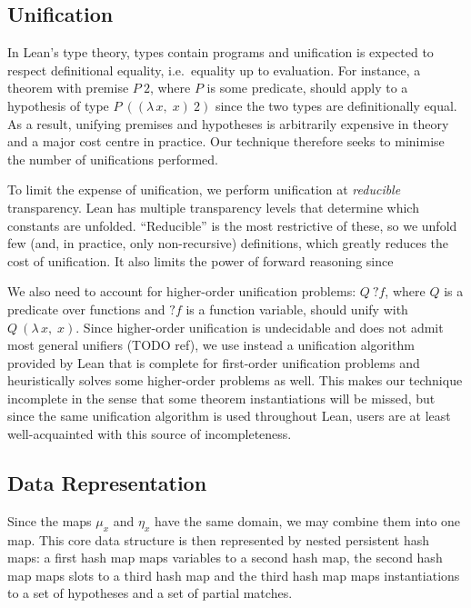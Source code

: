 \documentclass[runningheads]{llncs}
\newcommand{\Lam}[2]{\ensuremath{\lambda\, #1,\; #2}}
\newcommand{\mvar}[1]{\ensuremath{?#1}}
\begin{document}
\subsection{Unification}

In Lean's type theory, types contain programs and unification is expected to respect definitional equality, i.e.\ equality up to evaluation.
For instance, a theorem with premise $P~2$, where $P$ is some predicate, should apply to a hypothesis of type $P~((\Lam{x}{x})~2)$ since the two types are definitionally equal.
As a result, unifying premises and hypotheses is arbitrarily expensive in theory and a major cost centre in practice.
Our technique therefore seeks to minimise the number of unifications performed.

To limit the expense of unification, we perform unification at \emph{reducible} transparency.
Lean has multiple transparency levels that determine which constants are unfolded.
\enquote{Reducible} is the most restrictive of these, so we unfold few (and, in practice, only non-recursive) definitions, which greatly reduces the cost of unification.
It also limits the power of forward reasoning since

We also need to account for higher-order unification problems: $Q~\mvar{f}$, where $Q$ is a predicate over functions and $\mvar{f}$ is a function variable, should unify with $Q~(\Lam{x}{x})$.
Since higher-order unification is undecidable and does not admit most general unifiers (TODO ref), we use instead a unification algorithm provided by Lean that is complete for first-order unification problems and heuristically solves some higher-order problems as well.
This makes our technique incomplete in the sense that some theorem instantiations will be missed, but since the same unification algorithm is used throughout Lean, users are at least well-acquainted with this source of incompleteness.

\subsection{Data Representation}

Since the maps $μ_{x}$  and $η_{x}$ have the same domain, we may combine them into one map.
This core data structure is then represented by nested persistent hash maps: a first hash map maps variables to a second hash map, the second hash map maps slots to a third hash map and the third hash map maps instantiations to a set of hypotheses and a set of partial matches.
\end{document}
